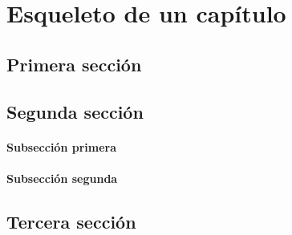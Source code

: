 \chapter{Esqueleto de un capítulo}
\label{ch:esqueleto}

\section{Primera sección}
\label{ch:esqueleto:primera}
\lipsum[1-3]

\section{Segunda sección}
\label{ch:esqueleto:segunda}
\lipsum[1-3]

\subsubsection{Subsección primera}
\label{ch:esqueleto:segunda:primera}
\lipsum[4-5]

\subsubsection{Subsección segunda}
\label{ch:esqueleto:segunda:segunda}
\lipsum[4-5]

\section{Tercera sección}
\label{ch:esqueleto:tercera}
\lipsum[1-3]